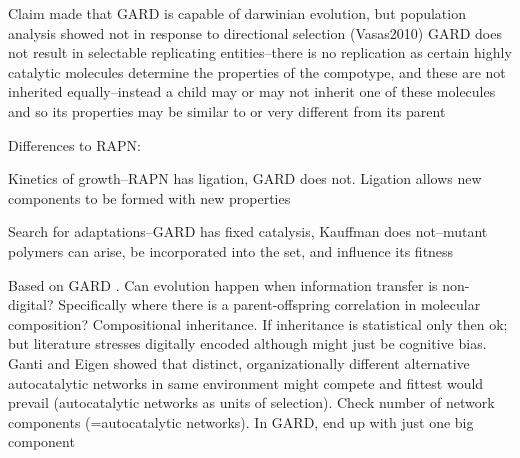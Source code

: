 Claim made that GARD is capable of darwinian evolution, but population analysis showed not in response to directional selection (Vasas2010) \parencite{Vasas2015, Vasas2012, Vasas2012a}
GARD does not result in selectable replicating entities--there is no replication as certain highly catalytic molecules determine the properties of the compotype, and these are not inherited equally--instead a child may or may not inherit one of these molecules and so its properties may be similar to or very different from its parent \parencite{Vasas2015, Vasas2012, Vasas2012a}

Differences to RAPN:
\begin{compactitem}
	\item Kinetics of growth--RAPN has ligation, GARD does not. Ligation allows new components to be formed with new properties
	\item Search for adaptations--GARD has fixed catalysis, Kauffman does not--mutant polymers can arise, be incorporated into the set, and influence its fitness
\end{compactitem}

\parencite{Vasas2015, Vasas2012, Vasas2012a}
Based on GARD \parencite{Segre1998}. Can evolution happen when information transfer is non-digital? Specifically where there is a parent-offspring correlation in molecular composition? Compositional inheritance. If inheritance is statistical only then ok; but literature stresses digitally encoded although might just be cognitive bias. Ganti and Eigen showed that distinct, organizationally different alternative autocatalytic networks in same environment might compete and fittest would prevail (\eg autocatalytic networks as units of selection).	Check number of network components (=autocatalytic networks). In GARD, end up with just one big component

%	
%

